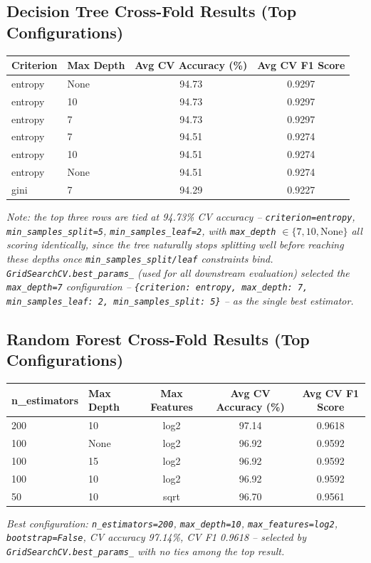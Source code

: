 \documentclass[12pt,a4paper]{article}
\begin{document}
\subsection*{Decision Tree Cross-Fold Results (Top Configurations)}
\begin{longtable}{llcc}
\toprule
Criterion & Max Depth & Avg CV Accuracy (\%) & Avg CV F1 Score \\
\midrule
entropy & None & 94.73 & 0.9297 \\
entropy & 10 & 94.73 & 0.9297 \\
entropy & 7 & 94.73 & 0.9297 \\
entropy & 7 & 94.51 & 0.9274 \\
entropy & 10 & 94.51 & 0.9274 \\
entropy & None & 94.51 & 0.9274 \\
gini & 7 & 94.29 & 0.9227 \\
\bottomrule
\end{longtable}
\textit{Note: the top three rows are tied at 94.73\% CV accuracy -- \texttt{criterion=entropy},
\texttt{min\_samples\_split=5}, \texttt{min\_samples\_leaf=2}, with \texttt{max\_depth} $\in
\{7, 10, \text{None}\}$ all scoring identically, since the tree naturally stops splitting well
before reaching these depths once \texttt{min\_samples\_split/leaf} constraints bind.
\texttt{GridSearchCV.best\_params\_} (used for all downstream evaluation) selected the
\texttt{max\_depth=7} configuration -- \texttt{\{criterion: entropy, max\_depth: 7,
min\_samples\_leaf: 2, min\_samples\_split: 5\}} -- as the single best estimator.}

\subsection*{Random Forest Cross-Fold Results (Top Configurations)}
\begin{longtable}{llccc}
\toprule
n\_estimators & Max Depth & Max Features & Avg CV Accuracy (\%) & Avg CV F1 Score \\
\midrule
200 & 10 & log2 & 97.14 & 0.9618 \\
100 & None & log2 & 96.92 & 0.9592 \\
100 & 15 & log2 & 96.92 & 0.9592 \\
100 & 10 & log2 & 96.92 & 0.9592 \\
50 & 10 & sqrt & 96.70 & 0.9561 \\
\bottomrule
\end{longtable}
\textit{Best configuration: \texttt{n\_estimators=200}, \texttt{max\_depth=10},
\texttt{max\_features=log2}, \texttt{bootstrap=False}, CV accuracy 97.14\%, CV F1 0.9618 --
selected by \texttt{GridSearchCV.best\_params\_} with no ties among the top result.}
\end{document}
